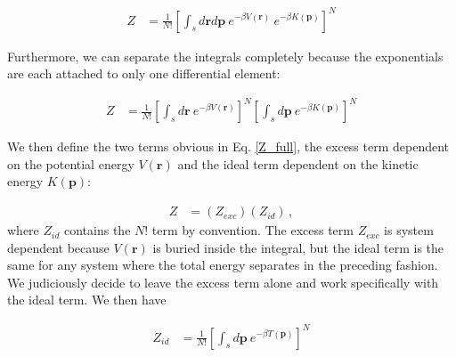 \documentclass[12pt]{article}
\begin{document}
\begin{align}
    Z &= \frac{1}{N!}\left[\int_s d\mathbf{r} d\mathbf{p} ~e^{-\beta V(\mathbf{r})}~e^{-\beta K(\mathbf{p})}\right]^{N}
\end{align}

Furthermore, we can separate the integrals completely because the exponentials are each attached to only one differential element:

\begin{align}
    Z &= \frac{1}{N!}\left[\int_s d\mathbf{r} ~e^{-\beta V(\mathbf{r})}\right]^{N}\left[\int_s d\mathbf{p} ~e^{-\beta K(\mathbf{p})}\right]^{N}
    \label{Z_full} 
\end{align}
 
We then define the two terms obvious in Eq. \ref{Z_full}, the excess term dependent on the potential energy $V(\mathbf{r})$ and the ideal term dependent on the kinetic energy $K(\mathbf{p})$: 

\begin{align}
    Z &= (Z_{exc})(Z_{id}) \,,
\end{align}
where $Z_{id}$ contains the $N!$ term by convention. The excess term $Z_{exc}$ is system dependent because $V(\mathbf{r})$ is buried inside the integral, but the ideal term is the same for any system where the total energy separates in the preceding fashion. We judiciously decide to leave the excess term alone and work specifically with the ideal term. We then have

\begin{align}
    Z_{id} &=  \frac{1}{N!}\left[\int_s d\mathbf{p} ~e^{-\beta T(\mathbf{p})}\right]^{N}
\end{align}
\end{document}
